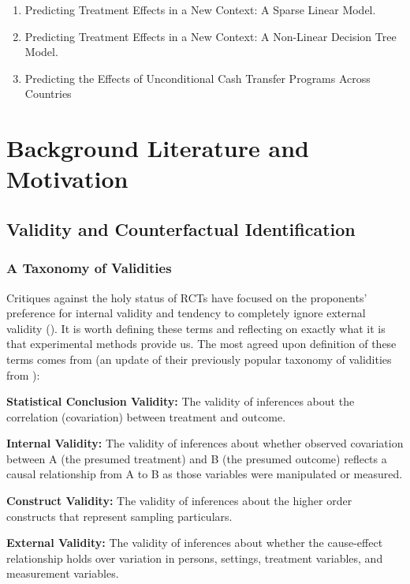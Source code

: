 \documentclass[a4paper,12pt]{article}
\begin{document}
\begin{enumerate}
\item Predicting Treatment Effects in a New Context: A Sparse Linear Model.
\item Predicting Treatment Effects in a New Context: A Non-Linear Decision Tree Model.
\item Predicting the Effects of Unconditional Cash Transfer Programs Across Countries
\end{enumerate}

\section{ Background Literature and Motivation }

\subsection{Validity and Counterfactual Identification}

\subsubsection{A Taxonomy of Validities}

Critiques against the holy status of RCTs have focused on the proponents' preference for internal validity and tendency to completely ignore external validity (\cite{Manski2013, Deaton2018}). It is worth defining these terms and reflecting on exactly what it is that experimental methods provide us. The most agreed upon definition of these terms comes from \cite{Shadish2002} (an update of their previously popular taxonomy of validities from \cite{Cook1979}):

\begin{displayquote}
\textbf{Statistical Conclusion Validity:} The validity of inferences about the correlation (covariation) between treatment and outcome.

\textbf{Internal Validity:} The validity of inferences about whether observed covariation between A (the presumed treatment) and B (the presumed outcome) reflects a causal relationship from A to B as those variables were manipulated or measured.

\textbf{Construct Validity:} The validity of inferences about the higher order constructs that represent sampling particulars.

\textbf{External Validity:} The validity of inferences about whether the cause-effect relationship holds over variation in persons, settings, treatment variables, and measurement variables.
\end{displayquote}
\end{document}

